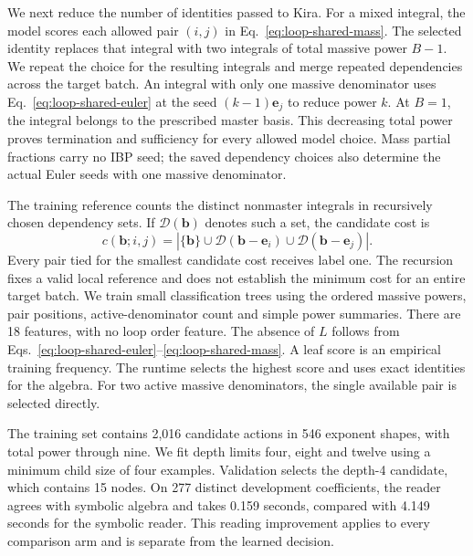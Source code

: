 We next reduce the number of identities passed to Kira. For a mixed
integral, the model scores each allowed pair \((i,j)\) in
Eq.~\eqref{eq:loop-shared-mass}. The selected identity replaces that integral
with two integrals of total massive power \(B-1\). We repeat the choice for
the resulting integrals and merge repeated dependencies across the target
batch. An integral with only one massive denominator uses
Eq.~\eqref{eq:loop-shared-euler} at the seed
\((k-1)\boldsymbol e_j\) to reduce power \(k\). At \(B=1\), the integral
belongs to the prescribed master basis. This decreasing total power
proves termination and sufficiency for every allowed model choice. Mass
partial fractions carry no IBP seed; the saved dependency choices also
determine the actual Euler seeds with one massive denominator.

The training reference counts the distinct nonmaster integrals in
recursively chosen dependency sets. If \(\mathcal D(\boldsymbol b)\)
denotes such a set, the candidate cost is
\begin{equation}
 c(\boldsymbol b;i,j)=
 \left|\{\boldsymbol b\}\cup
 \mathcal D(\boldsymbol b-\boldsymbol e_i)\cup
 \mathcal D(\boldsymbol b-\boldsymbol e_j)\right|.
 \label{eq:loop-choice-teacher}
\end{equation}
Every pair tied for the smallest candidate cost receives label one.
The recursion fixes a valid local reference and does not establish the
minimum cost for an entire target batch. We train small classification
trees using the ordered massive powers, pair positions, active-denominator
count and simple power summaries. There are 18 features, with no loop order
feature. The absence of \(L\) follows from
Eqs.~\eqref{eq:loop-shared-euler}--\eqref{eq:loop-shared-mass}.
A leaf score is an empirical training frequency. The runtime selects the
highest score and uses exact identities for the algebra. For two active
massive denominators, the single available pair is selected directly.

The training set contains 2,016 candidate actions in
546 exponent shapes, with total power through nine.
We fit depth limits four, eight and twelve using a minimum child size of
four examples. Validation selects the depth-4 candidate, which
contains 15 nodes. On 277 distinct development coefficients, the reader
agrees with symbolic algebra and takes 0.159 seconds,
compared with 4.149 seconds for the symbolic
reader. This reading improvement applies to every comparison arm and is
separate from the learned decision.


